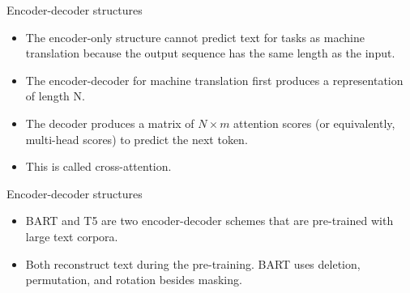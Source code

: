 \documentclass{beamer}
\begin{document}
\begin{frame}{Encoder-decoder structures}
    \begin{itemize}
        \item The encoder-only structure cannot predict text for tasks as machine translation because the output sequence has the same length as the input. 
        \item The encoder-decoder for machine translation first produces a representation of length N. 
        \item The decoder produces a matrix of $N\times m$ attention scores (or equivalently, multi-head scores) to predict the next token. 
        \item This is called cross-attention.  
    \end{itemize}
\end{frame}

\begin{frame}{Encoder-decoder structures}
    \begin{itemize}
    \item BART and T5 are two encoder-decoder schemes that are pre-trained with large text corpora. 
    \item Both reconstruct text during the pre-training. BART uses deletion, permutation, and rotation besides masking. 
    \end{itemize}
\end{frame}
\end{document}
